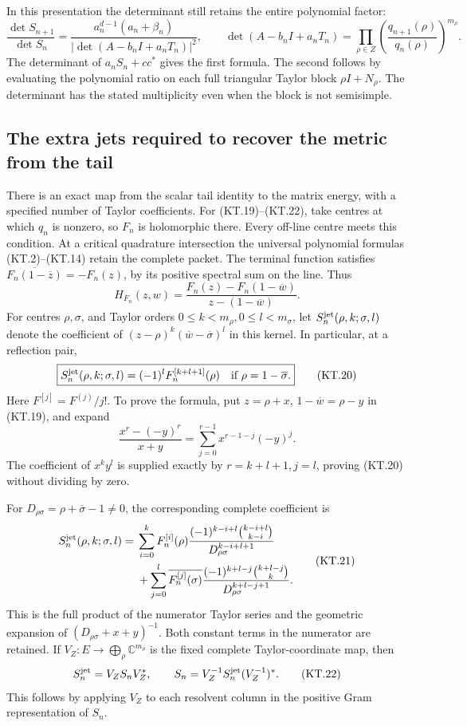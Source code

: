 In this presentation the determinant still retains the entire
polynomial factor:
\[
 \frac{\det S_{n+1}}{\det S_n}
  =\frac{a_n^{d-1}(a_n+\beta_n)}
    {|\det(A-b_nI+a_nT_n)|^2},\qquad
 \det(A-b_nI+a_nT_n)
   =\prod_{\rho\in Z}
       \left(\frac{q_{n+1}(\rho)}{q_n(\rho)}\right)^{m_\rho}.
                                                               \tag{KT.18}
\]
The determinant of \(a_nS_n+cc^*\) gives the first formula.
The second follows by evaluating the polynomial ratio on each
full triangular Taylor block \(\rho I+N_\rho\).  The determinant
has the stated multiplicity even when the block is not semisimple.

\subsection{The extra jets required to recover the metric from the tail}

There is an exact map from the scalar tail identity to the matrix
energy, with a specified number of Taylor coefficients.
For (KT.19)--(KT.22), take centres at which \(q_n\) is nonzero,
so \(F_n\) is holomorphic there.  Every off-line centre meets this
condition.  At a critical quadrature intersection the universal
polynomial formulas (KT.2)--(KT.14) retain the complete packet.
The
terminal function satisfies
\(\overline{F_n(1-\overline z)}=-F_n(z)\), by its positive
spectral sum on the line.  Thus
\[
 H_{F_n}(z,w)=
   \frac{F_n(z)-F_n(1-\overline w)}{z-(1-\overline w)}.   \tag{KT.19}
\]
For centres \(\rho,\sigma\), and Taylor orders
\(0\leq k<m_\rho,0\leq l<m_\sigma\), let
\(S_n^{\rm jet}(\rho,k;\sigma,l)\) denote the coefficient
of \((z-\rho)^k(\overline w-\overline\sigma)^l\) in this
kernel.  In particular, at a reflection pair,
\[
 \boxed{S_n^{\rm jet}(\rho,k;\sigma,l)
       =(-1)^lF_n^{[k+l+1]}(\rho)
       \quad\hbox{if }\rho=1-\overline\sigma.}          \tag{KT.20}
\]
Here \(F^{[j]}=F^{(j)}/j!\).  To prove the formula, put
\(z=\rho+x\), \(1-\overline w=\rho-y\) in (KT.19),
and expand
\[
 \frac{x^r-(-y)^r}{x+y}
      =\sum_{j=0}^{r-1}x^{r-1-j}(-y)^j.
\]
The coefficient of \(x^ky^l\) is supplied exactly by
\(r=k+l+1,j=l\), proving (KT.20) without dividing by zero.

For \(D_{\rho\sigma}=\rho+\overline\sigma-1\ne0\), the
corresponding complete coefficient is
\[
 \begin{split}
 S_n^{\rm jet}(\rho,k;\sigma,l)
 ={}&\sum_{i=0}^k F_n^{[i]}(\rho)
   \frac{(-1)^{k-i+l}\binom{k-i+l}{k-i}}
                     {D_{\rho\sigma}^{k-i+l+1}}\\
 &+\sum_{j=0}^l\overline{F_n^{[j]}(\sigma)}
   \frac{(-1)^{k+l-j}\binom{k+l-j}{k}}
                     {D_{\rho\sigma}^{k+l-j+1}}.
 \end{split}                                             \tag{KT.21}
\]
This is the full product of the numerator Taylor series and the
geometric expansion of \((D_{\rho\sigma}+x+y)^{-1}\).
Both constant terms in the numerator are retained.
If \(V_Z:E\to\bigoplus_\rho\mathbb C^{m_\rho}\) is the
fixed complete Taylor-coordinate map, then
\[
 S_n^{\rm jet}=V_ZS_nV_Z^*,\qquad
 S_n=V_Z^{-1}S_n^{\rm jet}(V_Z^{-1})^*.                  \tag{KT.22}
\]
This follows by applying \(V_Z\) to each resolvent column in
the positive Gram representation of \(S_n\).

